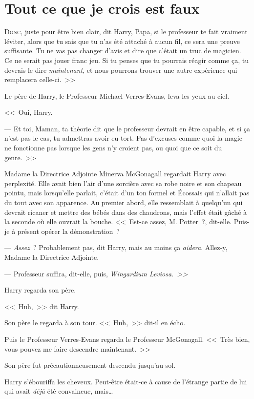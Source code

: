 \chapter{Tout ce que je crois est faux}

\lettrine[ante=<<~]{D}{onc}, juste pour être bien clair, dit Harry, Papa, si le professeur te fait vraiment léviter, alors que tu sais que tu n'as été attaché à aucun fil, ce sera une preuve suffisante. Tu ne vas pas changer d'avis et dire que c'était un truc de magicien. Ce ne serait pas jouer franc jeu. Si tu penses que tu pourrais réagir comme ça, tu devrais le dire \emph{maintenant}, et nous pourrons trouver une autre expérience qui remplacera celle-ci.~>>

Le père de Harry, le Professeur Michael Verres-Evans, leva les yeux au ciel.

<<~Oui, Harry.

--- Et toi, Maman, ta théorie dit que le professeur devrait en être capable, et si ça n'est pas le cas, tu admettras avoir eu tort. Pas d'excuses comme quoi la magie ne fonctionne pas lorsque les gens n'y croient pas, ou quoi que ce soit du genre.~>>

Madame la Directrice Adjointe Minerva McGonagall regardait Harry avec perplexité. Elle avait bien l'air d'une sorcière avec sa robe noire et son chapeau pointu, mais lorsqu'elle parlait, c'était d'un ton formel et Écossais qui n'allait pas du tout avec son apparence. Au premier abord, elle ressemblait à quelqu'un qui devrait ricaner et mettre des bébés dans des chaudrons, mais l'effet était gâché à la seconde où elle ouvrait la bouche. <<~Est-ce assez, M. Potter~?, dit-elle. Puis-je à présent opérer la démonstration~?

--- \emph{Assez}~? Probablement pas, dit Harry, mais au moins ça \emph{aidera}. Allez-y, Madame la Directrice Adjointe.

--- Professeur suffira, dit-elle, puis, \emph{Wingardium Leviosa.~>>}

Harry regarda son père.

<<~Huh,~>> dit Harry.

Son père le regarda à son tour. <<~Huh,~>> dit-il en écho.

Puis le Professeur Verres-Evans regarda le Professeur McGonagall. <<~Très bien, vous pouvez me faire descendre maintenant.~>>

Son père fut précautionneusement descendu jusqu'au sol.

Harry s'ébouriffa les cheveux. Peut-être était-ce à cause de l'étrange partie de lui qui avait \emph{déjà} été convaincue, mais…


